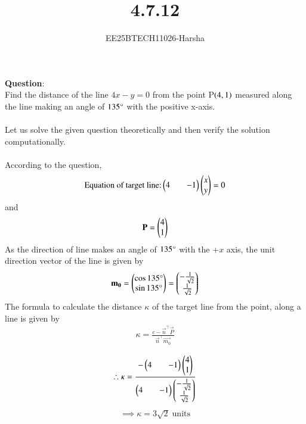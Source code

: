 \documentclass[journal]{IEEEtran}
\begin{document}

\vspace{3cm}

\title{4.7.12}
\author{EE25BTECH11026-Harsha}
 \maketitle
{\let\newpage\relax\maketitle}

\renewcommand{\thefigure}{\theenumi}
\renewcommand{\thetable}{\theenumi}
\setlength{\intextsep}{10pt} %


\renewcommand{\thetable}{\theenumi}

\textbf{Question}:\\
Find the distance of the line $4x-y=0$ from the point P$\left(4,1\right)$ measured along the line making an angle of $135\degree$ with the positive x-axis.\\
\solution \\
Let us solve the given question theoretically and then verify the solution computationally.\\
\\
According to the question,\\
\begin{align}
    \text{Equation of target line:}\begin{pmatrix}4&&-1\end{pmatrix}\begin{pmatrix}x\\y\end{pmatrix}=0
\end{align}
and
\begin{align}
    \mathbf{P}=\begin{pmatrix}4\\1\end{pmatrix}
\end{align}
As the direction of line makes an angle of $135\degree$ with the $+x$ axis, the unit direction vector of the line is given by
\begin{align}
    \mathbf{m_0}=\begin{pmatrix}\cos{135\degree}\\\sin{135\degree}\end{pmatrix}=\begin{pmatrix}-\frac{1}{\sqrt{2}}\\\frac{1}{\sqrt{2}}\end{pmatrix}
\end{align}
The formula to calculate the distance $\kappa$ of the target line from the point, along a line is given by
\begin{align}
    \kappa=\frac{c-\vec{n}^{\top}\vec{P}}{\vec{n}^{\top}\vec{m_0}}\\
\end{align}
\begin{align}
     \therefore \kappa=\frac{-\begin{pmatrix}4&&-1\end{pmatrix}\begin{pmatrix}4\\1\end{pmatrix}}{\begin{pmatrix}4&&-1\end{pmatrix}\begin{pmatrix}-\frac{1}{\sqrt{2}}\\\frac{1}{\sqrt{2}}\end{pmatrix}}
\end{align}
\begin{align}
    \implies \kappa=3\sqrt{2}\; \text{units}
\end{align}
\newpage
\vspace*{0.25cm}
\end{document}
